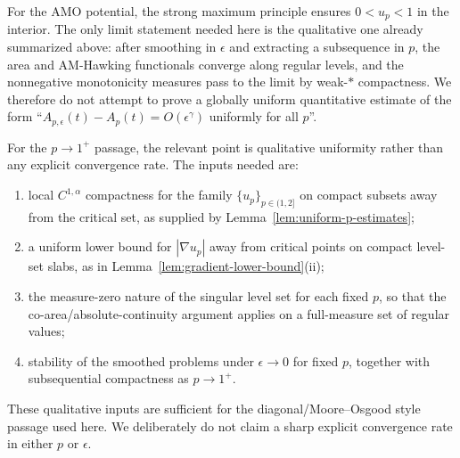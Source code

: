 \begin{remark}
For the AMO potential, the strong maximum principle ensures $0<u_p<1$ in the interior. The only limit statement needed here is the qualitative one already summarized above: after smoothing in $\epsilon$ and extracting a subsequence in $p$, the area and AM-Hawking functionals converge along regular levels, and the nonnegative monotonicity measures pass to the limit by weak-$*$ compactness. We therefore do not attempt to prove a globally uniform quantitative estimate of the form ``$A_{p,\epsilon}(t)-A_p(t)=O(\epsilon^\gamma)$ uniformly for all $p$''.
\end{remark}

\begin{remark}\label{rem:p-constants}
For the $p \to 1^+$ passage, the relevant point is qualitative uniformity rather than any explicit convergence rate. The inputs needed are:
\begin{enumerate}
    \item[(C1)] local $C^{1,\alpha}$ compactness for the family $\{u_p\}_{p\in(1,2]}$ on compact subsets away from the critical set, as supplied by Lemma~\ref{lem:uniform-p-estimates};
    \item[(C2)] a uniform lower bound for $|\nabla u_p|$ away from critical points on compact level-set slabs, as in Lemma~\ref{lem:gradient-lower-bound}(ii);
    \item[(C3)] the measure-zero nature of the singular level set for each fixed $p$, so that the co-area/absolute-continuity argument applies on a full-measure set of regular values;
    \item[(C4)] stability of the smoothed problems under $\epsilon \to 0$ for fixed $p$, together with subsequential compactness as $p \to 1^+$.
\end{enumerate}
These qualitative inputs are sufficient for the diagonal/Moore--Osgood style passage used here. We deliberately do not claim a sharp explicit convergence rate in either $p$ or $\epsilon$.
\end{remark}


